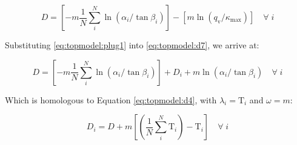 \documentclass[./main_en.tex]{subfiles}
\begin{document}
\begin{linenomath*}
\begin{equation}
\label{eq:topmodel:d7}
D = \left[ -m\frac{1}{N} \sum^{N}_{i} \ln{(\alpha_{i}/\tan \beta_{i})}\right]  - \left[m \ln{(q_{\text{v}} /\kappa_{\text{max}})}\right] \quad  \forall \; i 
\end{equation}
\end{linenomath*}
Substituting \eqref{eq:topmodel:plug1} into \eqref{eq:topmodel:d7}, we arrive at:
\begin{linenomath*}
\begin{equation}
\label{eq:topmodel:d8}
D = \left[ -m\frac{1}{N} \sum^{N}_{i} \ln{(\alpha_{i}/\tan \beta_{i})}\right] + D_{i} + m \ln{(\alpha_{i}/\tan \beta_{i})} \quad  \forall \; i 
\end{equation}
\end{linenomath*}
Which is homologous to Equation \eqref{eq:topmodel:d4}, with $\lambda_{i} = \text{T}_{i}$ and $\omega = m$:
\begin{linenomath*}
\begin{equation}
\label{eq:topmodel:d9}
D_{i}= D +   m  \left[ \left( \frac{1}{N} \sum^{N}_{i} \text{T}_{i}\right) - \text{T}_{i}\right] \quad  \forall \; i 
\end{equation}
\end{linenomath*}
\end{document}
